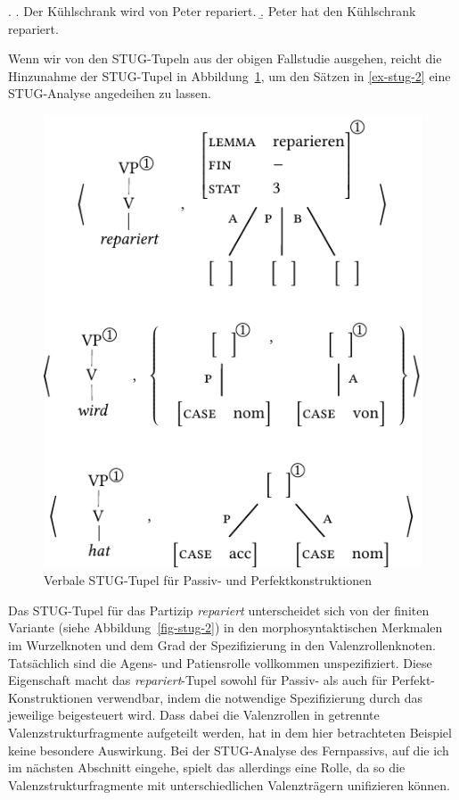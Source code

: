 \ex. \label{ex-stug-2}
\a.  \label{ex-stug-2-a} Der Kühlschrank wird von Peter repariert.
\b. \label{ex-stug-2-b} Peter hat den Kühlschrank repariert.

Wenn wir von den STUG-Tupeln aus der obigen Fallstudie ausgehen, reicht die Hinzunahme der STUG-Tupel in Abbildung~\ref{fig-stug-5}, um den Sätzen in \ref{ex-stug-2} eine STUG-Analyse angedeihen zu lassen.
\begin{figure}[t]
\centering
\includegraphics{graphics/abb95.pdf}
\caption{\label{fig-stug-5}Verbale STUG-Tupel für Passiv- und Perfektkonstruktionen}
\end{figure}
Das STUG-Tupel für das Partizip {\it repariert} unterscheidet sich von der finiten Variante (siehe Abbildung~\ref{fig-stug-2}) in den morphosyntaktischen Merkmalen im Wurzelknoten und dem Grad der Spezifizierung in den Valenzrollenknoten. Tatsächlich sind die Agens- und Patiensrolle vollkommen unspezifiziert. Diese Eigenschaft macht das {\it repariert}-Tupel sowohl für Passiv- als auch für Perfekt-Konstruktionen verwendbar, indem die notwendige Spezifizierung durch das jeweilige  beigesteuert wird. Dass dabei die Valenzrollen in getrennte Valenzstrukturfragmente aufgeteilt werden, hat in dem hier betrachteten Beispiel keine besondere Auswirkung. Bei der STUG-Analyse des Fernpassivs, auf die ich im nächsten Abschnitt eingehe, spielt das allerdings eine Rolle, da so die Valenzstrukturfragmente mit unterschiedlichen Valenzträgern unifizieren können.  

